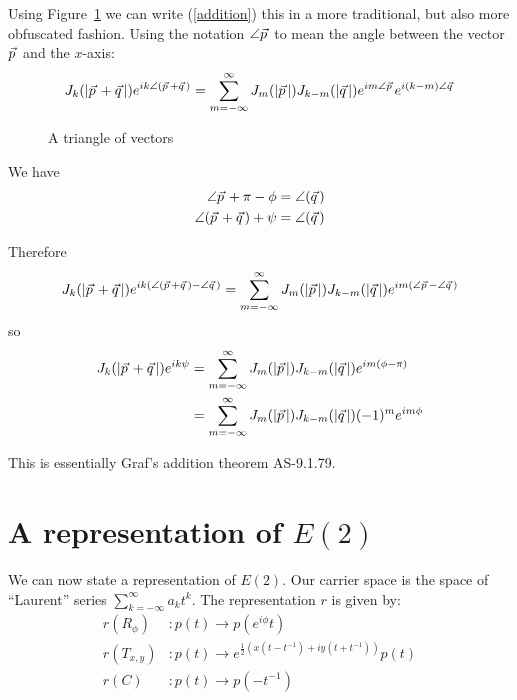 \documentclass{article}
\newcommand\myvec[1]{\vec{#1}\hspace{0.5mm}}
\begin{document}
Using Figure~\ref{triangle} we can write (\ref{addition}) this in a more traditional, but also more obfuscated fashion.
Using the notation $\angle\myvec{p}$ to mean the angle between the vector $\myvec{p}$ and the $x$-axis:
\[
J_k(|\myvec{p}+\myvec{q}|)e^{ik\angle(\myvec{p}+\myvec{q})} = \sum_{m=-\infty}^\infty J_m(|\myvec{p}|)J_{k-m}(|\myvec{q}|)e^{im\angle\myvec{p}}e^{i(k-m)\angle\myvec{q}}
\]


\begin{figure}
\centering
{}
\caption{A triangle of vectors}
\label{triangle}
\end{figure}

We have
\begin{align*}
\angle\myvec{p}+\pi-\phi & = \angle(\myvec{q}) \\
\angle(\myvec{p}+\myvec{q})+\psi & = \angle(\myvec{q}) 
\end{align*}

Therefore
\[
J_k(|\myvec{p}+\myvec{q}|)e^{ik(\angle(\myvec{p}+\myvec{q})-\angle\myvec{q})} = \sum_{m=-\infty}^\infty J_m(|\myvec{p}|)J_{k-m}(|\myvec{q}|)e^{im(\angle\myvec{p}-\angle\myvec{q})}
\]
so
\begin{align*}
J_k(|\myvec{p}+\myvec{q}|)e^{ik\psi} & = \sum_{m=-\infty}^\infty J_m(|\myvec{p}|)J_{k-m}(|\myvec{q}|)e^{im(\phi-\pi)} \\
                                 & = \sum_{m=-\infty}^\infty J_m(|\myvec{p}|)J_{k-m}(|\myvec{q}|)(-1)^me^{im\phi}
\end{align*}

This is essentially Graf's addition theorem AS-9.1.79.

\section{A representation of $E(2)$}
We can now state a representation of $E(2)$.
Our carrier space is the space of ``Laurent'' series $\sum_{k=-\infty}^\infty a_kt^k$.
The representation $r$ is given by:
\begin{align*}
r(R_\phi) & : p(t) \rightarrow p(e^{i\phi}t)\\
r(T_{x,y}) & : p(t) \rightarrow e^{\frac{1}{2}(x(t-t^{-1})+iy(t+t^{-1}))}p(t) \\
r(C) & : p(t) \rightarrow p(-t^{-1})
\end{align*}
\end{document}
